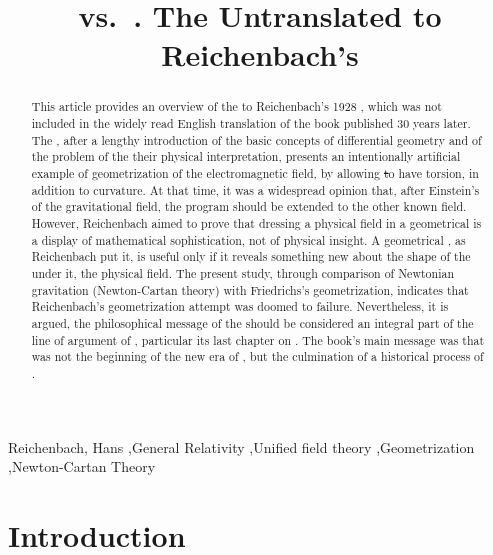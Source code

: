 \documentclass[submitted]{article}
\title{\scare{Geometrization of Physics} vs.\ \scare{Physicalization of Geometry}. The Untranslated \Ap to Reichenbach's \PRZL}
\newcommand{\PRZL}{\citetitle{Reichenbach1928}\xspace}
\begin{document}
\maketitle


\begin{abstract}
This article provides an overview of the \Ap to Reichenbach's 1928 \PRZL, which was not included in the widely read English translation of the book published 30 years later. The \Ap, after a lengthy introduction of the basic concepts of differential geometry and of the problem of the their physical interpretation, presents an intentionally artificial example of geometrization of the electromagnetic field, by allowing \st to have torsion, in addition to curvature. At that time, it was a widespread opinion that, after Einstein's  of the gravitational field, the  program should be extended to the other known field. However, Reichenbach aimed to prove that dressing a physical field in a geometrical  is a display of mathematical sophistication, not of physical insight. A geometrical , as Reichenbach put it, is useful only if it reveals something new about the shape of the  under it, the physical field. The present study, through comparison of Newtonian gravitation (Newton-Cartan theory) with Friedrichs's geometrization, indicates that Reichenbach's geometrization attempt was doomed to failure. Nevertheless, it is argued, the philosophical message of the \Ap should be considered an integral part of the line of argument of \PRZL, particular its last chapter on \gr. The book's main message was that \gr was not the beginning of the new era of , but the culmination of a historical process of .
\end{abstract}



\begin{keywords}
Reichenbach, Hans \sep General Relativity \sep Unified field theory \sep Geometrization 
\sep Newton-Cartan Theory
\end{keywords}


\section*{Introduction}
\end{document}
